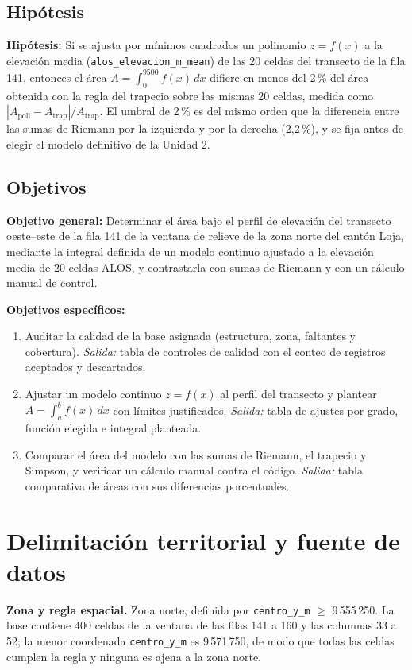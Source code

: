 \documentclass[11pt,a4paper]{article}
\begin{document}
\subsection{Hipótesis}
\textbf{Hipótesis:} Si se ajusta por mínimos cuadrados un polinomio $z = f(x)$ a la elevación media (\texttt{alos\_elevacion\_m\_mean}) de las 20 celdas del transecto de la fila 141, entonces el área $A = \int_{0}^{9500} f(x)\,dx$ difiere en menos del 2\,\% del área obtenida con la regla del trapecio sobre las mismas 20 celdas, medida como $|A_{\text{poli}} - A_{\text{trap}}| / A_{\text{trap}}$. El umbral de 2\,\% es del mismo orden que la diferencia entre las sumas de Riemann por la izquierda y por la derecha (2,2\,\%), y se fija antes de elegir el modelo definitivo de la Unidad 2.

\subsection{Objetivos}
\textbf{Objetivo general:} Determinar el área bajo el perfil de elevación del transecto oeste--este de la fila 141 de la ventana de relieve de la zona norte del cantón Loja, mediante la integral definida de un modelo continuo ajustado a la elevación media de 20 celdas ALOS, y contrastarla con sumas de Riemann y con un cálculo manual de control.

\textbf{Objetivos específicos:}
\begin{enumerate}
  \item Auditar la calidad de la base asignada (estructura, zona, faltantes y cobertura). \emph{Salida:} tabla de controles de calidad con el conteo de registros aceptados y descartados.
  \item Ajustar un modelo continuo $z = f(x)$ al perfil del transecto y plantear $A = \int_a^b f(x)\,dx$ con límites justificados. \emph{Salida:} tabla de ajustes por grado, función elegida e integral planteada.
  \item Comparar el área del modelo con las sumas de Riemann, el trapecio y Simpson, y verificar un cálculo manual contra el código. \emph{Salida:} tabla comparativa de áreas con sus diferencias porcentuales.
\end{enumerate}

\section{Delimitación territorial y fuente de datos}
\textbf{Zona y regla espacial.} Zona norte, definida por \texttt{centro\_y\_m} $\geq$ 9\,555\,250. La base contiene 400 celdas de la ventana de las filas 141 a 160 y las columnas 33 a 52; la menor coordenada \texttt{centro\_y\_m} es 9\,571\,750, de modo que todas las celdas cumplen la regla y ninguna es ajena a la zona norte.
\end{document}
